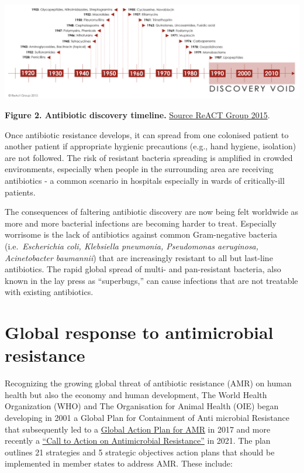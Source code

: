 \documentclass[
]{book}
\begin{document}
\includegraphics[width=26.15625in,height=\textheight]{images/ab-discovery-timeline.png}

\textbf{Figure 2. Antibiotic discovery timeline.} \href{https://www.reactgroup.org/}{Source ReACT Group 2015}.

Once antibiotic resistance develops, it can spread from one colonised patient to another patient if appropriate hygienic precautions (e.g., hand hygiene, isolation) are not followed. The risk of resistant bacteria spreading is amplified in crowded environments, especially when people in the surrounding area are receiving antibiotics - a common scenario in hospitals especially in wards of critically-ill patients.

The consequences of faltering antibiotic discovery are now being felt worldwide as more and more bacterial infections are becoming harder to treat. Especially worrisome is the lack of antibiotics against common Gram-negative bacteria (i.e.~\emph{Escherichia coli, Klebsiella pneumonia, Pseudomonas aeruginosa, Acinetobacter baumannii}) that are increasingly resistant to all but last-line antibiotics. The rapid global spread of multi- and pan-resistant bacteria, also known in the lay press as ``superbugs,'' can cause infections that are not treatable with existing antibiotics.

\hypertarget{global-response-to-antimicrobial-resistance}{%
\section*{Global response to antimicrobial resistance}\label{global-response-to-antimicrobial-resistance}}

Recognizing the growing global threat of antibiotic resistance (AMR) on human health but also the economy and human development, The World Health Organization (WHO) and The Organisation for Animal Health (OIE) began developing in 2001 a Global Plan for Containment of Anti microbial Resistance that subsequently led to a \href{https://www.who.int/publications/i/item/9789241509763}{Global Action Plan for AMR} in 2017 and more recently a \href{https://www.who.int/news/item/30-07-2021-call-to-action-on-antimicrobial-resistance-2021}{``Call to Action on Antimicrobial Resistance''} in 2021. The plan outlines 21 strategies and 5 strategic objectives action plans that should be implemented in member states to address AMR. These include:
\end{document}
